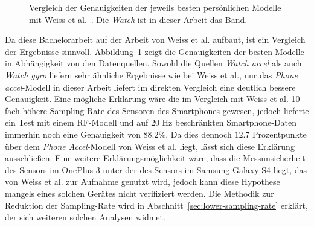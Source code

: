 \begin{figure}
	\centering
	\caption[Vergleich der Genauigkeiten der persönlichen Modelle mit Weiss et al.~\cite{Weiss2016}]{Vergleich der Genauigkeiten der jeweils besten persönlichen Modelle mit Weiss et al.~\cite{Weiss2016}. Die \textit{Watch} ist in dieser Arbeit das Band.}
	\label{fig:accuracy-personal-vs-weiss}
\end{figure}

Da diese Bachelorarbeit auf der Arbeit von Weiss et al. \cite{Weiss2016} aufbaut, ist ein Vergleich der Ergebnisse sinnvoll. Abbildung~\ref{fig:accuracy-personal-vs-weiss} zeigt die Genauigkeiten der besten Modelle in Abhängigkeit von den Datenquellen. Sowohl die Quellen \textit{Watch accel} als auch \textit{Watch gyro} liefern sehr ähnliche Ergebnisse wie bei Weiss et al., nur das \textit{Phone accel}-Modell in dieser Arbeit liefert im direkten Vergleich eine deutlich bessere Genauigkeit. Eine mögliche Erklärung wäre die im Vergleich mit Weiss et al. 10-fach höhere Sampling-Rate des Sensoren des Smartphones gewesen, jedoch lieferte ein Test mit einem RF-Modell und auf 20 Hz beschränkten Smartphone-Daten immerhin noch eine Genauigkeit von $88.2 \%$. Da dies dennoch $12.7$ Prozentpunkte über dem \textit{Phone Accel}-Modell von Weiss et al. liegt, lässt sich diese Erklärung ausschließen. Eine weitere Erklärungsmöglichkeit wäre, dass die Messunsicherheit des Sensors im OnePlus 3 unter der des Sensors im Samsung Galaxy S4 liegt, das von Weiss et al. zur Aufnahme genutzt wird, jedoch kann diese Hypothese mangels eines solchen Gerätes nicht verifiziert werden. Die Methodik zur Reduktion der Sampling-Rate wird in Abschnitt~\ref{sec:lower-sampling-rate} erklärt, der sich weiteren solchen Analysen widmet.

